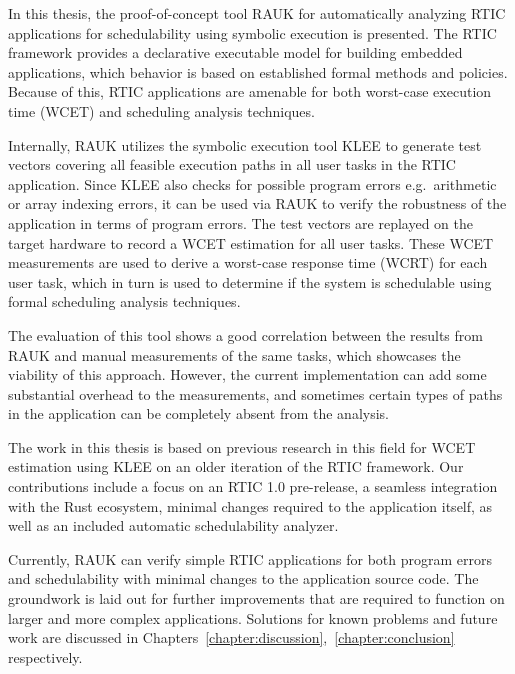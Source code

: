 In this thesis, the proof-of-concept tool RAUK for automatically analyzing
RTIC applications for schedulability using symbolic execution is presented.
The RTIC framework provides a declarative executable model for building
embedded applications, which behavior is based on established formal methods
and policies. Because of this, RTIC applications are amenable for both
worst-case execution time (WCET) and scheduling analysis techniques.

Internally, RAUK utilizes the symbolic execution tool KLEE to generate test
vectors covering all feasible execution paths in all user tasks in the RTIC
application. Since KLEE also checks for possible program errors e.g.\
arithmetic or array indexing errors, it can be used via RAUK to verify the
robustness of the application in terms of program errors. The test vectors are
replayed on the target hardware to record a WCET estimation for all user tasks.
These WCET measurements are used to derive a worst-case response time (WCRT)
for each user task, which in turn is used to determine if the system is
schedulable using formal scheduling analysis techniques.

The evaluation of this tool shows a good correlation between the results from
RAUK and manual measurements of the same tasks, which showcases the viability
of this approach. However, the current implementation can add some substantial
overhead to the measurements, and sometimes certain types of paths in the
application can be completely absent from the analysis.

The work in this thesis is based on previous research in this field for WCET
estimation using KLEE on an older iteration of the RTIC framework. Our
contributions include a focus on an RTIC 1.0 pre-release, a seamless
integration with the Rust ecosystem, minimal changes required to the
application itself, as well as an included automatic schedulability analyzer.

Currently, RAUK can verify simple RTIC applications for both program errors and
schedulability with minimal changes to the application source code. The
groundwork is laid out for further improvements that are required to function
on larger and more complex applications. Solutions for known problems and future work
are discussed in Chapters~\ref{chapter:discussion},~\ref{chapter:conclusion} respectively.
